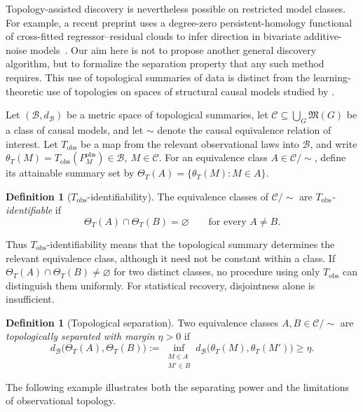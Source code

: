 \documentclass[11pt,a4paper]{article}
\theoremstyle{plain}
\theoremstyle{definition}
\newtheorem{definition}[theorem]{Definition}
\theoremstyle{remark}
\newcommand{\1}{\mathbbm{1}}
\begin{document}
Topology-assisted discovery is nevertheless possible on restricted model classes. For example, a recent preprint uses a degree-zero persistent-homology functional of cross-fitted
regressor--residual clouds to infer direction in bivariate
additive-noise models~\citep{elbouchattaoui2026}. Our aim here is not to propose another general discovery algorithm, but to formalize the separation property that any such method requires. This use of topological summaries of data is distinct from the learning-theoretic use of topologies on spaces of structural causal models studied by
\citet{ibelingicard2021}.

Let \((\mathcal B,d_{\mathcal B})\) be a metric space of
topological summaries, let
\(\mathcal C\subseteq\bigcup_G\mathfrak M(G)\) be a class of
causal models, and let \(\sim\) denote the causal equivalence
relation of interest. Let \(T_{\mathrm{obs}}\) be a map from
the relevant observational laws into \(\mathcal B\), and write
\(\theta_T(M) = T_{\mathrm{obs}}(P_M^{\mathrm{obs}})
\in\mathcal B, \ M\in\mathcal C\). For an equivalence class \(A\in\mathcal C/{\sim}\), define its attainable summary set by
\(\Theta_T(A) =\{\theta_T(M):M\in A\}\).

\begin{definition}[\(T_{\mathrm{obs}}\)-identifiability]
\label{def:T-identifiability}
The equivalence classes of \(\mathcal C/{\sim}\) are
\emph{\(T_{\mathrm{obs}}\)-identifiable} if
\[
\Theta_T(A)\cap\Theta_T(B)=\varnothing
\qquad
\text{for every }A\neq B.
\]
\end{definition}

Thus \(T_{\mathrm{obs}}\)-identifiability means that the topological summary determines the relevant equivalence class, although it need not be constant within a class. If
\(\Theta_T(A)\cap\Theta_T(B)\neq\varnothing\) for two distinct classes, no procedure using only \(T_{\mathrm{obs}}\) can distinguish them uniformly. For statistical recovery, disjointness alone is insufficient.

\begin{definition}[Topological separation]
\label{def:topological-separation}
Two equivalence classes
\(A,B\in\mathcal C/{\sim}\) are \emph{topologically separated with margin \(\eta>0\)} if
\[
d_{\mathcal B}\bigl(\Theta_T(A),\Theta_T(B)\bigr)
:=
\inf_{\substack{M\in A\\M'\in B}}
d_{\mathcal B}\bigl(\theta_T(M),\theta_T(M')\bigr)
\geq\eta.
\]
\end{definition}

The following example illustrates both the separating power and the limitations of observational topology.
\end{document}
